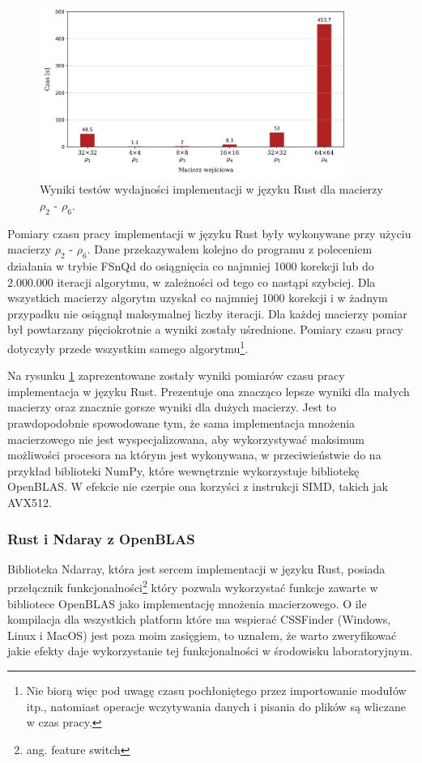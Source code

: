 \documentclass[11pt, a4paper]{article}
\begin{document}
\begin{sloppypar}
    \FloatBarrier
    \begin{figure}[ht]
      \centering
      \includegraphics[width=0.9\textwidth]{"resources/rust_performance_tests.png"}
      \caption{Wyniki testów wydajności implementacji w języku Rust dla macierzy $\rho_{2}$ - $\rho
      _{6}$.}
      \label{fourth-perf}
    \end{figure}
    \FloatBarrier

    Pomiary czasu pracy implementacji w języku Rust były wykonywane przy użyciu macierzy
    $\rho_{2}$ - $\rho_{6}$. Dane przekazywałem kolejno do programu z poleceniem
    działania w trybie FSnQd do osiągnięcia co najmniej 1000 korekcji lub do 2.000.000 iteracji
    algorytmu, w zależności od tego co nastąpi szybciej. Dla wszystkich macierzy algorytm
    uzyskał co najmniej 1000 korekcji i w żadnym przypadku nie osiągnął maksymalnej liczby
    iteracji. Dla każdej macierzy pomiar był powtarzany pięciokrotnie a wyniki zostały
    uśrednione. Pomiary czasu pracy dotyczyły przede wszystkim samego algorytmu\footnote{Nie
    biorą więc pod uwagę czasu pochłoniętego przez importowanie modułów itp., natomiast
    operacje wczytywania danych i pisania do plików są wliczane w czas pracy.}.

    Na rysunku \ref{fourth-perf} zaprezentowane zostały wyniki pomiarów czasu pracy
    implementacja w języku Rust. Prezentuje ona znacząco lepsze wyniki dla małych macierzy
    oraz znacznie gorsze wyniki dla dużych macierzy. Jest to prawdopodobnie spowodowane
    tym, że sama implementacja mnożenia macierzowego nie jest wyspecjalizowana, aby
    wykorzystywać maksimum możliwości procesora na którym jest wykonywana, w przeciwieństwie
    do na przykład biblioteki NumPy, które wewnętrznie wykorzystuje bibliotekę OpenBLAS\cite{NumPy_Doc}.
    W efekcie nie czerpie ona korzyści z instrukcji SIMD, takich jak AVX512.

    \subsubsection{ Rust i Ndaray z OpenBLAS }
    Biblioteka Ndarray, która jest sercem implementacji w języku Rust, posiada przełącznik
    funkcjonalności\footnote{ang. feature switch} który pozwala wykorzystać funkcje
    zawarte w bibliotece OpenBLAS jako implementację mnożenia macierzowego. O ile kompilacja
    dla wszystkich platform które ma wspierać CSSFinder (Windows, Linux i MacOS) jest
    poza moim zasięgiem, to uznałem, że warto zweryfikować jakie efekty daje
    wykorzystanie tej funkcjonalności w środowisku laboratoryjnym.


\end{sloppypar}
\end{document}
